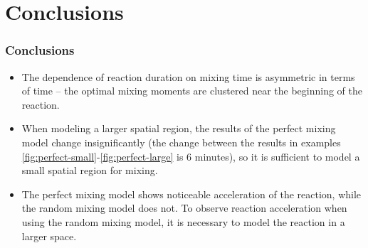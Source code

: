 \documentclass{beamer}
\begin{document}

\section{Conclusions}

\begin{frame}
  \frametitle{Conclusions}
  \begin{itemize}
    \item The dependence of reaction duration on mixing time is asymmetric in terms of time -- the optimal mixing moments are clustered near the beginning of the reaction.
    
    \item When modeling a larger spatial region, the results of the perfect mixing model change insignificantly (the change between the results in examples \ref{fig:perfect-small}-\ref{fig:perfect-large} is 6 minutes), so it is sufficient to model a small spatial region for mixing.
    
    \item The perfect mixing model shows noticeable acceleration of the reaction, while the random mixing model does not. To observe reaction acceleration when using the random mixing model, it is necessary to model the reaction in a larger space.
  \end{itemize}
\end{frame}
\end{document}
